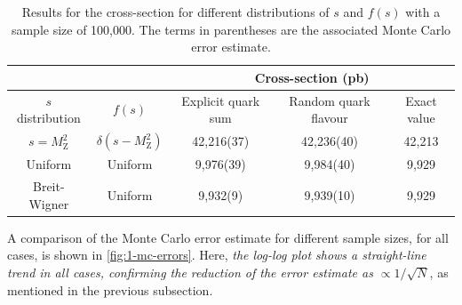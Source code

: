 \begin{table}[ht!]
    \centering
    \renewcommand{\arraystretch}{1.5}
    \begin{tabular}{|c|c|c|c|c|}
        \hline \multicolumn{2}{|c|}{} & \multicolumn{3}{c|}{Cross-section (pb)} \\ \hline
        $s$ distribution & $f(s)$ & Explicit quark sum & Random quark flavour & Exact value \\ \hline
        $s = M_{\text{Z}}^{2}$ & $\delta(s - M_{\text{Z}}^{2})$ & 42,216(37) & 42,236(40) & 42,213 \\ \hline
        Uniform & Uniform & 9,976(39) & 9,984(40) & 9,929 \\ \hline
        Breit-Wigner & Uniform & 9,932(9) & 9,939(10) & 9,929 \\ \hline
    \end{tabular}
    \caption{Results for the cross-section for different distributions of $s$ and $f(s)$ with a sample size of 100,000. The terms in parentheses are the associated Monte Carlo error estimate.}
    \label{tab:1-cross-sections}
\end{table}

A comparison of the Monte Carlo error estimate for different sample sizes, for all cases, is shown in \autoref{fig:1-mc-errors}. Here, \emph{the log-log plot shows a straight-line trend in all cases, confirming the reduction of the error estimate as $\propto 1 / \sqrt{N}$}, as mentioned in the previous subsection. 

